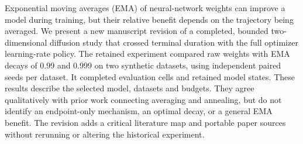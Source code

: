 Exponential moving averages (EMA) of neural-network weights can improve a
model during training, but their relative benefit depends on the trajectory
being averaged. We present a new manuscript revision of a completed, bounded
two-dimensional diffusion study that crossed terminal duration with the full
optimizer learning-rate policy. The retained experiment compared raw weights
with EMA decays of 0.99 and 0.999 on two synthetic datasets, using
 independent paired seeds per dataset. It completed
 evaluation cells and retained  model
states. 
These results describe the selected model, datasets and budgets. They agree
qualitatively with prior work connecting averaging and annealing, but do not
identify an endpoint-only mechanism, an optimal decay, or a general EMA benefit.
The revision adds a critical literature map and portable paper sources without
rerunning or altering the historical experiment.

